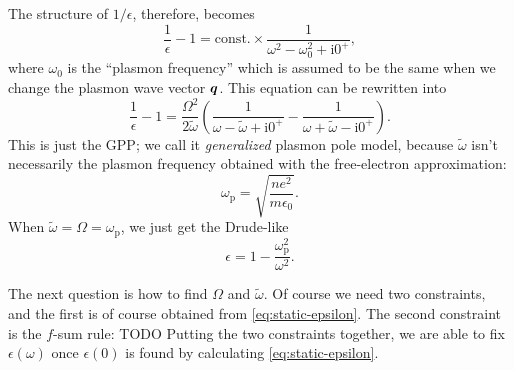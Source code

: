 \documentclass[hyperref, a4paper, 12pt]{report}
\newcommand*{\ii}{\mathrm{i}}
\newcommand*{\const}{\mathrm{const}}
\begin{document}
The structure of $1/\epsilon$, therefore, becomes 
\begin{equation}
    \frac{1}{\epsilon} - 1 = \const. \times \frac{1}{\omega^2 - \omega_0^2 + \ii 0^+},
\end{equation}
where $\omega_0$ is the ``plasmon frequency'' 
which is assumed to be the same when we change
the plasmon wave vector $\vb*{q}$.
This equation can be rewritten into 
\begin{equation}
    \frac{1}{\epsilon} - 1 = \frac{\Omega^2}{2 \tilde{\omega}} \left(
        \frac{1}{\omega - \tilde{\omega} + \ii 0^+}
        - \frac{1}{\omega + \tilde{\omega} - \ii 0^+}
    \right).
\end{equation}
This is just the GPP; 
we call it \emph{generalized} plasmon pole model, 
because $\tilde{\omega}$ isn't necessarily the plasmon frequency 
obtained with the free-electron approximation: 
\begin{equation}
    \omega_{\text{p}} = \sqrt{\frac{n e^2}{m \epsilon_0}}.
\end{equation}
When $\tilde{\omega} = \Omega = \omega_{\text{p}}$,
we just get the Drude-like 
\begin{equation}
    \epsilon = 1 - \frac{\omega_{\text{p}}^2}{\omega^2}.
\end{equation}

The next question is how to find $\Omega$ and $\tilde{\omega}$.
Of course we need two constraints, 
and the first is of course obtained from \eqref{eq:static-epsilon}.
The second constraint is the $f$-sum rule: TODO
Putting the two constraints together, 
we are able to fix $\epsilon(\omega)$ once $\epsilon(0)$ is found 
by calculating \eqref{eq:static-epsilon}.
\end{document}
